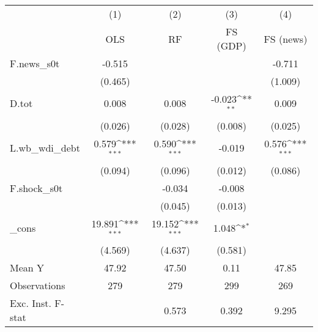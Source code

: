 {
\def\sym#1{\ifmmode^{#1}\else\(^{#1}\)\fi}
\begin{tabular}{l*{4}{c}}
\toprule
            &\multicolumn{1}{c}{(1)}&\multicolumn{1}{c}{(2)}&\multicolumn{1}{c}{(3)}&\multicolumn{1}{c}{(4)}\\
            &\multicolumn{1}{c}{OLS}&\multicolumn{1}{c}{RF}&\multicolumn{1}{c}{FS (GDP)}&\multicolumn{1}{c}{FS (news)}\\
\midrule
F.news\_s0t  &      -0.515         &                     &                     &      -0.711         \\
            &     (0.465)         &                     &                     &     (1.009)         \\
\addlinespace
D.tot       &       0.008         &       0.008         &      -0.023\sym{**} &       0.009         \\
            &     (0.026)         &     (0.028)         &     (0.008)         &     (0.025)         \\
\addlinespace
L.wb\_wdi\_debt&       0.579\sym{***}&       0.590\sym{***}&      -0.019         &       0.576\sym{***}\\
            &     (0.094)         &     (0.096)         &     (0.012)         &     (0.086)         \\
\addlinespace
F.shock\_s0t &                     &      -0.034         &      -0.008         &                     \\
            &                     &     (0.045)         &     (0.013)         &                     \\
\addlinespace
\_cons      &      19.891\sym{***}&      19.152\sym{***}&       1.048\sym{*}  &                     \\
            &     (4.569)         &     (4.637)         &     (0.581)         &                     \\
\midrule
Mean Y      &       47.92         &       47.50         &        0.11         &       47.85         \\
Observations&         279         &         279         &         299         &         269         \\
Exc. Inst. F-stat&                     &       0.573         &       0.392         &       9.295         \\
\bottomrule
\end{tabular}
}
